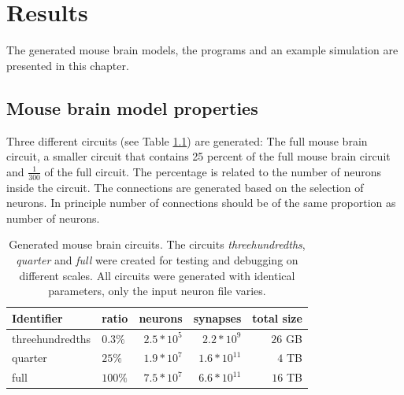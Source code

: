 %



\lstset{escapechar=@,style=customc}


\chapter{Results}

The generated mouse brain models, the programs and an example simulation are presented in this chapter.

\section{Mouse brain model properties}
Three different circuits (see Table \ref{table:circuits}) are generated: The full mouse brain circuit,
a smaller circuit that contains 25 percent of the full mouse brain circuit and
$\frac{1}{300}$ of the full circuit. The percentage is related to the number of neurons inside
the circuit. The connections are generated based on the selection of neurons. In principle
number of connections should be of the same proportion as number of neurons.

\begin{table}[ht!]
\centering
    \begin{tabular}{ | l | l | r | r | r |}
    \hline
    Identifier & ratio & neurons & synapses & total size \\ \hline \hline
    threehundredths & $0.3\%$ & $~2.5*10^5$ & $~2.2*10^9$ & $~26$ GB \\ \hline
    quarter & $25\%$ & $~1.9*10^7$ & $~1.6*10^{11}$ & $~4$ TB \\ \hline
    full & $100\%$ & $~7.5*10^7$ & $~6.6*10^{11}$ & $~16$ TB \\ \hline
    \end{tabular}
    \caption[Generated mouse brain circuits]{Generated mouse brain circuits. The circuits \emph{threehundredths}, \emph{quarter} and \emph{full} were created for testing and debugging on different scales.
All circuits were generated with identical parameters, only the input neuron file varies.}

\label{table:circuits}
\end{table}

